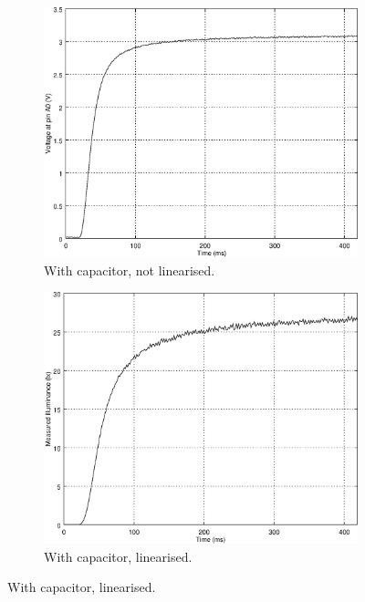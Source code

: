 \begin{figure}[h]
    \centering
    \begin{subfigure}[t]{0.49\textwidth}
	\centering
	\includegraphics[width=.95\textwidth]{img/step_response}
	\caption{With capacitor, not linearised.}
	\label{fig:step_response}
    \end{subfigure}
    \begin{subfigure}[t]{0.49\textwidth}
	\centering
	\includegraphics[width=.95\textwidth]{img/step_response_linearised}
	\caption{With capacitor, linearised.}
	\label{fig:step_response_linearised}
    \end{subfigure}


\end{figure}
